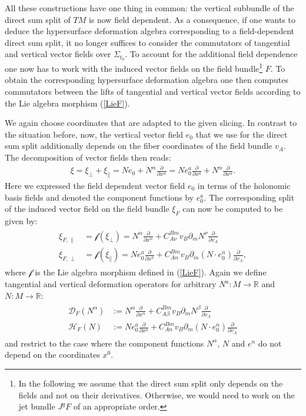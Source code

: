 \documentclass[a4paper,12pt, DIV=14, BCOR=5mm, twoside, headsepline, numbers=noenddot]{scrbook}
\begin{document}
All these constructions have one thing in common: the vertical subbundle of the direct sum split of $TM$ is now field dependent. As a consequence, if one wants to deduce the hypersurface deformation algebra corresponding to a field-dependent direct sum split, it no longer suffices to consider the commutators of tangential and vertical vector fields over $\Sigma_{t_0}$. To account for the additional field dependence one now has to work with the induced vector fields on the field bundle\footnote{In the following we assume that the direct sum split only depends on the fields and not on their derivatives. Otherwise, we would need to work on the jet bundle $J^qF$ of an appropriate order.} $F$. To obtain the corresponding hypersurface deformation algebra one then computes commutators between the lifts of tangential and vertical vector fields according to the Lie algebra morphism (\ref{LieF}).

We again choose coordinates that are adapted to the given slicing. In contrast to the situation before, now, the vertical vector field $e_0$ that we use for the direct sum split additionally depends on the fiber coordinates of the field bundle $v_A$. The decomposition of vector fields then reads:
\begin{align}
    \xi = \xi_{\perp} + \xi_{\parallel} = N e_0 + N^{\alpha} \frac{\partial }{\partial x^{\alpha}} = N  e_0^a \frac{\partial}{\partial x^a} + N^{\alpha} \frac{\partial }{\partial x^{\alpha}}.
\end{align}
Here we expressed the field dependent vector field $e_0$ in terms of the holonomic basis fields and denoted the component functions by $e_0^a$.
The corresponding split of the induced vector field on the field bundle $\xi_F$ can now be computed to be given by:
\begin{align}
    \begin{aligned}
    \xi_{F,\parallel} &= \mathcal{f} \left ( \xi_{\perp} \right ) = N^{\alpha} \frac{\partial}{\partial x^{\alpha}} + C_{A \nu}^{B m} v_B \partial_{m} N^{\nu} \frac{\partial}{\partial v_A} \\
    \xi_{F, \perp} &= \mathcal{f} \left ( \xi_{\parallel} \right )=  N e_0^a \frac{\partial}{\partial x^a} + C_{A n}^{B m} v_B \partial_{m} (N \cdot e_0^n) \frac{\partial}{\partial v_A},
    \end{aligned}
\end{align}
where $\mathcal{f}$ is the Lie algebra morphism defined in (\ref{LieF}).
Again we define tangential and vertical deformation operators for arbitrary $N^a : M \rightarrow \mathbb{R}$ and $N : M \rightarrow \mathbb{R}$:
\begin{align}
    \begin{aligned}
    \mathcal{D}_F(N^{\alpha})&:= N^{\alpha} \frac{\partial}{\partial x^{\alpha}} + C_{A \beta}^{B m} v_B \partial_{m} N^{\beta} \frac{\partial}{\partial v_A} \\
    \mathcal{H}_F(N) &:=  N e_0^a \frac{\partial}{\partial x^a} + C_{A n}^{B m} v_B \partial_{m} (N \cdot e_0^n) \frac{\partial}{\partial v_A}
    \end{aligned}
\end{align}
and restrict to the case where the component functions $N^{\alpha}$, $N$ and $e^n$ do not depend on the coordinates $x^0$.
\end{document}
